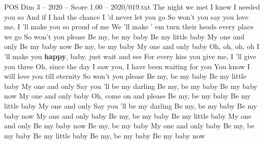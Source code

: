 \begin{textsample}{POS Dim 3 – 2020 – Score 1.00 – 2020/019.txt}  \label{ex:f3_pos_010}
The night we met I knew I needed you so And if I had the chance I 'd never let you go So won't you say you love me, I 'll make you so proud of me We 'll make ' em turn their heads every place we go So won't you please Be my, be my baby Be my little baby My one and only Be my baby now Be my, be my baby My one and only baby Oh, oh, oh, oh I 'll make you \textbf{happy}, baby, just wait and see For every kiss you give me, I 'll give you three Oh, since the day I saw you, I have been waiting for you You know I will love you till eternity So won't you please Be my, be my baby Be my little baby My one and only Say you 'll be my darling Be my, be my baby Be my baby now My one and only baby Oh, come on and please Be my, be my baby Be my little baby My one and only Say you 'll be my darling Be my, be my baby Be my baby now My one and only baby Be my, be my baby Be my little baby My one and only Be my baby now Be my, be my baby My one and only baby Be my, be my baby Be my little baby Be my, be my baby Be my baby now

\end{textsample}
